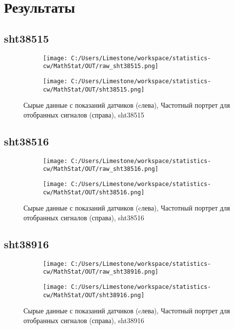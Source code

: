 \documentclass[12pt]{article}%
\begin{document}
%
\normalsize%
\section{Результаты}%
\label{sec:}%
\subsection{sht38515}%
\label{subsec:sht38515}%


\begin{figure}[h!]%
\begin{subfigure}[b]{0.45\linewidth}%
\texttt{[image: C:/Users/Limestone/workspace/statistics-cw/MathStat/OUT/raw\_sht38515.png]}%
\end{subfigure}%
\begin{subfigure}[b]{0.45\linewidth}%
\texttt{[image: C:/Users/Limestone/workspace/statistics-cw/MathStat/OUT/sht38515.png]}%
\end{subfigure}%
\caption{Сырые данные с показаний датчиков (cлева), Частотный портрет для отобранных сигналов (справа), sht38515}%
\end{figure}

%
\subsection{sht38516}%
\label{subsec:sht38516}%


\begin{figure}[h!]%
\begin{subfigure}[b]{0.45\linewidth}%
\texttt{[image: C:/Users/Limestone/workspace/statistics-cw/MathStat/OUT/raw\_sht38516.png]}%
\end{subfigure}%
\begin{subfigure}[b]{0.45\linewidth}%
\texttt{[image: C:/Users/Limestone/workspace/statistics-cw/MathStat/OUT/sht38516.png]}%
\end{subfigure}%
\caption{Сырые данные с показаний датчиков (cлева), Частотный портрет для отобранных сигналов (справа), sht38516}%
\end{figure}

%
\subsection{sht38916}%
\label{subsec:sht38916}%


\begin{figure}[h!]%
\begin{subfigure}[b]{0.45\linewidth}%
\texttt{[image: C:/Users/Limestone/workspace/statistics-cw/MathStat/OUT/raw\_sht38916.png]}%
\end{subfigure}%
\begin{subfigure}[b]{0.45\linewidth}%
\texttt{[image: C:/Users/Limestone/workspace/statistics-cw/MathStat/OUT/sht38916.png]}%
\end{subfigure}%
\caption{Сырые данные с показаний датчиков (cлева), Частотный портрет для отобранных сигналов (справа), sht38916}%
\end{figure}
\end{document}
